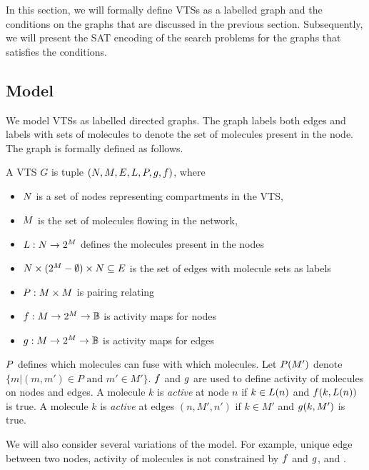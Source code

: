 In this section, we will formally define VTSs as a labelled graph
and the conditions on the graphs that are discussed in the previous
section.
Subsequently, we will present the SAT encoding of the search problems
for the graphs that satisfies the conditions.

\subsection{Model}

We model VTSs as labelled directed graphs.
The graph labels both edges and labels with sets of molecules to denote
the set of molecules present in the node.
The graph is formally defined as follows.

\begin{df}
  A VTS $G$ is tuple $(N,M,E,L,P,g,f)$, where
  \begin{itemize}
  \item $N$ is a set of nodes representing compartments in the VTS,
  \item $M$ is the set of molecules flowing in the network, 
  \item $L : N \rightarrow 2^{M}$ defines the molecules present in the nodes  
  \item $ N \times (2^{M}-\emptyset) \times N \subseteq E$ is the set of edges
    with molecule sets as labels
  \item $P : M \times M$ is pairing relating
  \item $f : M \rightarrow 2^{M} \rightarrow \mathbb{B}$ is activity maps for nodes
  \item $g : M \rightarrow 2^{M} \rightarrow \mathbb{B} $ is activity maps for edges
  \end{itemize}
\end{df}
$P$ defines which molecules can fuse with which molecules.
%
Let $P(M')$ denote $\{m|(m,m') \in P \text{ and } m' \in M'\}$.
%
$f$ and $g$ are used to define activity of molecules on
nodes and edges.
%
A molecule $k$ is {\em active} at node $n$ if $k \in L(n)$ and
$f(k,L(n))$ is true.
%
A molecule $k$ is {\em active} at edges $(n,M',n')$ if $k \in M'$ and
$g(k,M')$ is true.
%

We will also consider several variations of the model.
%
For example, unique edge between two nodes, activity of molecules is
not constrained by $f$ and $g$, and .
%

